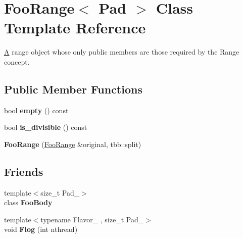 \hypertarget{classFooRange}{}\section{Foo\+Range$<$ Pad $>$ Class Template Reference}
\label{classFooRange}


\hyperlink{structA}{A} range object whose only public members are those required by the Range concept.  


\subsection*{Public Member Functions}
\begin{DoxyCompactItemize}
\item 
\hypertarget{classFooRange_a4b219d264c4fc2286d8d71c9a4fe8f48}{}bool {\bfseries empty} () const \label{classFooRange_a4b219d264c4fc2286d8d71c9a4fe8f48}

\item 
\hypertarget{classFooRange_a3bcb0d143326b794eb402d1549bbd561}{}bool {\bfseries is\+\_\+divisible} () const \label{classFooRange_a3bcb0d143326b794eb402d1549bbd561}

\item 
\hypertarget{classFooRange_ac92e59bc077a5191c1b92bfd05cd327d}{}{\bfseries Foo\+Range} (\hyperlink{classFooRange}{Foo\+Range} \&original, tbb\+::split)\label{classFooRange_ac92e59bc077a5191c1b92bfd05cd327d}

\end{DoxyCompactItemize}
\subsection*{Friends}
\begin{DoxyCompactItemize}
\item 
\hypertarget{classFooRange_adcf9eed7e3c82af14e56fb72a329c756}{}{\footnotesize template$<$size\+\_\+t Pad\+\_\+$>$ }\\class {\bfseries Foo\+Body}\label{classFooRange_adcf9eed7e3c82af14e56fb72a329c756}

\item 
\hypertarget{classFooRange_aa75206a0225a9557bdeaa728d5d5570c}{}{\footnotesize template$<$typename Flavor\+\_\+ , size\+\_\+t Pad\+\_\+$>$ }\\void {\bfseries Flog} (int nthread)\label{classFooRange_aa75206a0225a9557bdeaa728d5d5570c}

\end{DoxyCompactItemize}


